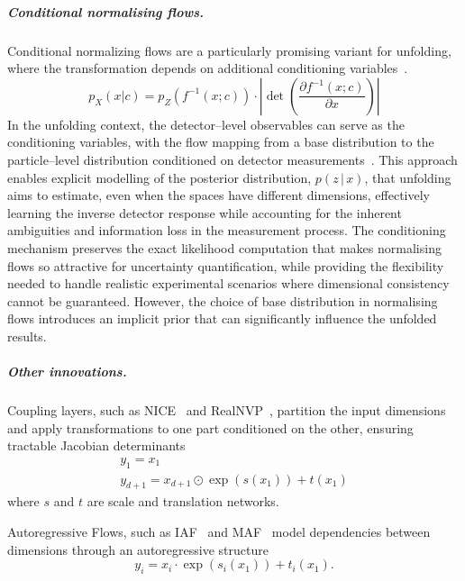             \subparagraph[Conditional normalising flows]{Conditional normalising flows.}
            \label{subpar:conditional-nfs}
                Conditional normalizing flows are a particularly promising variant for unfolding, where the transformation depends on additional conditioning variables~\cite{Winkler2019LearningFlows}.
                \begin{equation}
                    p_X(x|c) = p_Z(f^{-1}(x; c)) \cdot \left|\det\left(\frac{\partial f^{-1}(x; c)}{\partial x}\right)\right|
                \end{equation}
                In the unfolding context, the detector--level observables can serve as the conditioning variables, with the flow mapping from a base distribution to the particle--level distribution conditioned on detector measurements~\cite{Vischia2020NewUnfolding, Algren2023FlowReweighting}.
                This approach enables explicit modelling of the posterior distribution,
                \(p(z\, |\, x)\), that unfolding aims to estimate, even when the spaces have different dimensions, effectively learning the inverse detector response while accounting for the inherent ambiguities and information loss in the measurement process.
                The conditioning mechanism preserves the exact likelihood computation that makes normalising flows so attractive for uncertainty quantification, while providing the flexibility needed to handle realistic experimental scenarios where dimensional consistency cannot be guaranteed.
                However, the choice of base distribution in normalising flows introduces an implicit prior that can significantly influence the unfolded results.
            \subparagraph{Other innovations.}
                Coupling layers, such as NICE~\cite{dinh_nice_2015} and RealNVP~\cite{dinh_density_2017}, partition the input dimensions and apply transformations to one part conditioned on the other, ensuring tractable Jacobian determinants
                \begin{gather}
                    y_{1} = x_{1} \\
                    y_{d+1} = x_{d+1} \odot \exp(s(x_{1})) + t(x_{1})
                \end{gather}
                where \(s\) and \(t\) are scale and translation networks.
    
                Autoregressive Flows, such as IAF~\cite{kingma_improving_2017} and MAF~\cite{papamakarios_masked_2018} model dependencies between dimensions through an autoregressive structure
                \begin{equation}
                    y_i = x_i \cdot \exp(s_i(x_{1})) + t_i(x_{1}).
                \end{equation}
                
